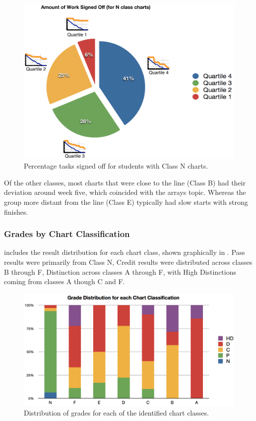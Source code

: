 \begin{figure}[thbp]
  \centering
  \includegraphics[width=0.75\columnwidth]{AmountSignedOffForN}
  \caption{Percentage tasks signed off for students with Class N charts.}
  \label{fig:end_point}
\end{figure}

Of the other classes, most charts that were close to the line (Class B) had their deviation around week five, which coincided with the arrays topic. Whereas the group more distant from the line (Class E) typically had slow starts with strong finishes. 




\subsubsection{Grades by Chart Classification} %
\label{sub:grades_by_chart_classification}

 includes the result distribution for each chart class, shown graphically in . Pass results were primarily from Class N, Credit results were distributed across classes B through F, Distinction across classes A through F, with High Distinctions coming from classes A though C and F.

\begin{figure}[thb]
  \centering
  \includegraphics[width=\columnwidth]{GradesForEachChartKind}
  \caption{Distribution of grades for each of the identified chart classes.}
  \label{fig:grade_chart_dist}
\end{figure}


